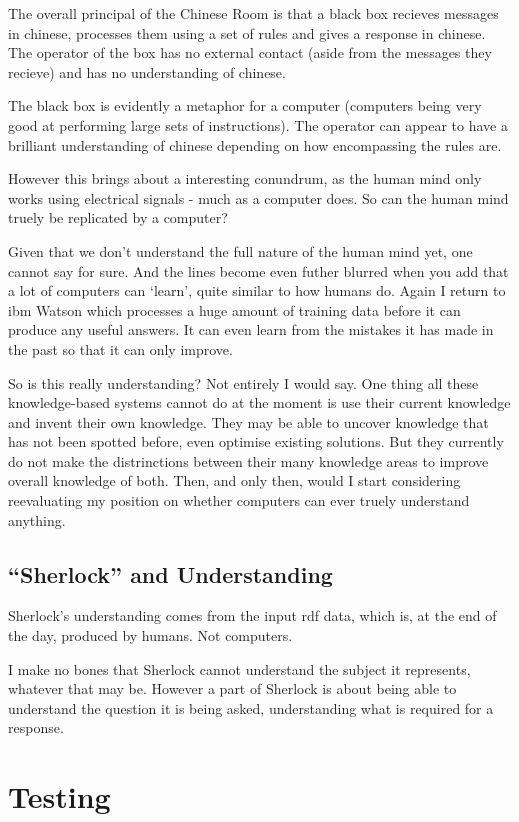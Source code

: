 \documentclass[11pt,a4paper]{report}
\begin{document}
The overall principal of the Chinese Room is that a black box recieves messages 
in chinese, processes them using a set of rules and gives a response in chinese.
The operator of the box has no external contact (aside from the messages they 
recieve) and has no understanding of chinese.

The black box is evidently a metaphor for a computer (computers being very good
at performing large sets of instructions). The operator can appear to have a 
brilliant understanding of chinese depending on how encompassing the rules are.

However this brings about a interesting conundrum, as the human mind only works
using electrical signals - much as a computer does. So can the human mind truely
be replicated by a computer?

Given that we don't understand the full nature of the human mind yet, one cannot
say for sure. And the lines become even futher blurred when you add that a lot of
computers can `learn', quite similar to how humans do. Again I return to \gls{ibm} 
Watson which processes a huge amount of training data before it can produce any
useful answers. It can even learn from the mistakes it has made in the past so
that it can only improve.

So is this really understanding? Not entirely I would say. One thing all these 
knowledge-based systems cannot do at the moment is use their current knowledge
and invent their own knowledge. They may be able to uncover knowledge that has 
not been spotted before, even optimise existing solutions. But they currently
do not make the distrinctions between their many knowledge areas to improve
overall knowledge of both. Then, and only then, would I start considering 
reevaluating my position on whether computers can ever truely understand anything.

\section{``Sherlock'' and Understanding}
Sherlock's understanding comes from the input \gls{rdf} data, which is, at the end of
the day, produced by humans. Not computers.

I make no bones that Sherlock cannot understand the subject it represents, 
whatever that may be. However a part of Sherlock is about being able to 
understand the question it is being asked, understanding what is required for a response.

\chapter{Testing}

\end{document}
